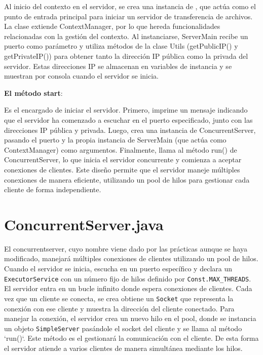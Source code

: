 \documentclass[a4paper, 12pt]{report}
\begin{document}
Al inicio del contexto en el servidor, se crea una instancia de , que actúa como el punto de
entrada principal para iniciar un servidor de transferencia de archivos. La clase extiende ContextManager,
por lo que hereda funcionalidades relacionadas con la gestión del contexto. Al instanciarse, ServerMain recibe
un puerto como parámetro y utiliza métodos de la clase Utils (getPublicIP() y getPrivateIP())
para obtener tanto la dirección IP pública como la privada del
servidor. Estas direcciones IP se almacenan en variables de instancia y se muestran por consola cuando el servidor se inicia.

\textbf{El método start}:

Es el encargado de iniciar el servidor. Primero, imprime un mensaje
indicando que el servidor ha comenzado a escuchar en el puerto
especificado, junto con las direcciones IP pública y privada. Luego,
crea una instancia de ConcurrentServer, pasando el puerto y la propia instancia de ServerMain (que actúa como ContextManager) como argumentos. Finalmente, llama al método run() de ConcurrentServer,
lo que inicia el servidor concurrente y comienza a aceptar conexiones
de clientes. Este diseño permite que el servidor maneje múltiples
conexiones de manera eficiente, utilizando un pool de hilos para
gestionar cada cliente de forma independiente.



\section{ConcurrentServer.java}

El concurrentserver, cuyo nombre viene dado por las prácticas aunque se haya modificado, manejará múltiples
conexiones de clientes utilizando un pool de hilos. Cuando el servidor se inicia, escucha en un puerto
específico y declara un \texttt{ExecutorService}  con un número fijo de hilos definido por
\texttt{Const.MAX\_THREADS}. El servidor entra en un bucle infinito donde espera conexiones de clientes. Cada
vez que un cliente se conecta, se crea obtiene un \texttt{Socket} que
representa la conexión con ese cliente y muestra la dirección del cliente
conectado. Para manejar la conexión, el servidor crea un nuevo hilo en el pool, donde se instancia un
objeto \texttt{SimpleServer} pasándole el socket del cliente y se llama al método `run()`. Este método es el
gestionará la comunicación con el cliente. De esta forma el servidor atiende a varios
clientes de manera simultánea mediante los hilos.
\end{document}
